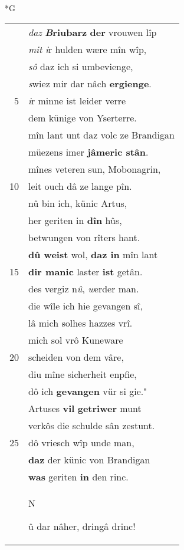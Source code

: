 \documentclass[8pt,a4paper,notitlepage]{article}
\begin{document}
\newpage
\begin{table}[ht]
\begin{minipage}[t]{0.5\linewidth}
\small
\begin{center}*G
\end{center}
\begin{tabular}{rl}
 & \textit{daz} \textbf{\textit{B}riubarz} \textbf{der} vrouwen lîp\\ 
 & \textit{mit i}r hulden wære mîn wîp,\\ 
 & \textit{sô} daz ich si umbevienge,\\ 
 & \textit{s}wiez mir dar nâch \textbf{ergienge}.\\ 
5 & \textit{i}r minne ist leider verre\\ 
 & dem künige von Yserterre.\\ 
 & mîn lant unt daz volc ze Brandigan\\ 
 & müezens imer \textbf{jâmeric stân}.\\ 
 & mînes veteren sun, Mobonagrin,\\ 
10 & leit ouch dâ ze lange pîn.\\ 
 & nû bin ich, künic Artus,\\ 
 & her geriten in \textbf{dîn} hûs,\\ 
 & betwungen von rîters hant.\\ 
 & \textbf{dû weist} wol, \textbf{daz in} mîn lant\\ 
15 & \textbf{dir manic} laster \textbf{ist} getân.\\ 
 & des vergiz n\textit{û}, \textit{w}erder man.\\ 
 & die wîle ich hie gevangen sî,\\ 
 & lâ mich solhes hazzes vrî.\\ 
 & mich sol vrô Kuneware\\ 
20 & scheiden von dem vâre,\\ 
 & diu mîne sicherheit enpfie,\\ 
 & dô ich \textbf{gevangen} vür si gie."\\ 
 & Artuses \textbf{vil} \textbf{getriwer} munt\\ 
 & verkôs die schulde sân zestunt.\\ 
25 & dô vriesch wîp unde man,\\ 
 & \textbf{daz} der künic von Brandigan\\ 
 & \textbf{was} geriten \textbf{in} den rinc.\\ 
 & \begin{large}N\end{large}û dar nâher, dringâ drinc!\\ 

\end{tabular}
\end{minipage}
\end{table}
\end{document}
